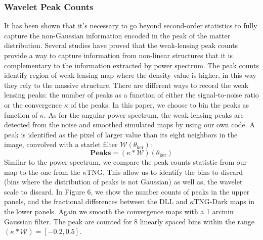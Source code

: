 \documentclass[twocolumn,twocolappendix]{aastex63}
\begin{document}
\subsubsection{Wavelet Peak Counts}
It has been shown that it's necessary to go beyond second-order statistics to fully capture the non-Gaussian information encoded in the peak of the matter distribution. Several studies have proved that the  weak-lensing peak counts provide a way to capture information from non-linear structures that it is complementary to the information extracted by power spectrum.
The peak counts identify region of weak lensing map where the density value is higher, in this way they rely to the massive structure.
There are different ways to record the weak lensing peaks: the number of peaks as a function of either the signal-to-noise ratio or the convergence $\kappa$ of the peaks. 
In this paper, we choose to bin the peaks as function of $\kappa$. 
As for the angular power spectrum, the weak lensing peaks are detected from the noise and smoothed simulated maps by using our own code.
A peak is identified as the pixel of larger value than its eight neighbors in the image, convolved with a starlet filter $\mathcal{W}(\theta_{\text{ker}})$:
\begin{equation}
    \textbf{Peaks}=(\kappa*\mathcal{W})(\theta_{\text{ker}})
\end{equation}
Similar to the power spectrum, we compare the peak counts statistic from our map to the one from the $\kappa$TNG.
This allow us to identify the bins to discard (bins where the distribution of peaks is not Gaussian) as well as, the wavelet scale to discard. 
In Figure 6, we show the number counts of peaks in the upper panels, and the fractional differences between the DLL and $\kappa$TNG-Dark maps in the lower panels.
Again we smooth the convergence maps with a 1 arcmin Gaussian filter. The peak are counted for 8 linearly spaced bins within the range $(\kappa*\mathcal{W})=[-0.2, 0.5]$. 
\end{document}
